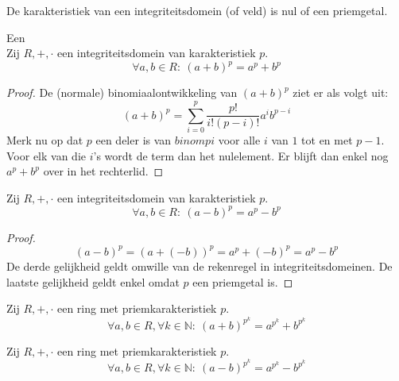 \documentclass[main.tex]{subfiles}
\begin{document}
\begin{gev}
  De karakteristiek van een integriteitsdomein (of veld) is nul of een priemgetal.
\end{gev}

\begin{st}
  \label{st:rekenregel-in-integriteitsdomein}
  Een \\
  Zij $R,+,\cdot$ een integriteitsdomein van karakteristiek $p$.
  \[ \forall a,b \in R:\ (a+b)^{p} = a^{p}+b^{p} \]

  \begin{proof}
    De (normale) binomiaalontwikkeling van $(a+b)^{p}$ ziet er als volgt uit:
    \[ (a+b)^{p} = \sum_{i=0}^{p}\frac{p!}{i!(p-i)!} a^{i}b^{p-i} \]
    Merk nu op dat $p$ een deler is van $binom{p}{i}$ voor alle $i$ van $1$ tot en met $p-1$.
    Voor elk van die $i$'s wordt de term dan het nulelement.
    Er blijft dan enkel nog $a^{p} + b^{p}$ over in het rechterlid.
  \end{proof}
\end{st}

\begin{st}
  Zij $R,+,\cdot$ een integriteitsdomein van karakteristiek $p$.
  \[ \forall a,b \in R:\ (a-b)^{p} = a^{p}-b^{p} \]

  \begin{proof}
    \[ (a-b)^{p} = (a+(-b))^{p} = a^{p} + (-b)^{p} = a^{p} - b^{p} \]
    De derde gelijkheid geldt omwille van de rekenregel in integriteitsdomeinen.
    De laatste gelijkheid geldt enkel omdat $p$ een priemgetal is.
  \end{proof}
\end{st}

\begin{st}
  Zij $R,+,\cdot$ een ring met priemkarakteristiek $p$.
  \[ \forall a,b \in R, \forall k \in \mathbb{N}:\ (a+b)^{p^{k}} = a^{p^{k}}+b^{p^{k}} \]
\end{st}

\begin{st}
  Zij $R,+,\cdot$ een ring met priemkarakteristiek $p$.
  \[ \forall a,b \in R, \forall k \in \mathbb{N}:\ (a-b)^{p^{k}} = a^{p^{k}}-b^{p^{k}} \]
\end{st}
\end{document}
